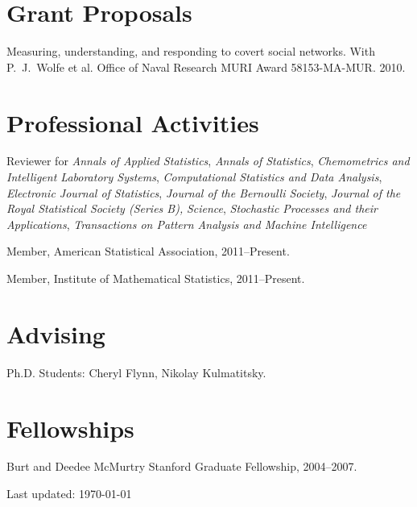 \documentclass[10pt,letterpaper]{article}
\renewenvironment{itemize}{
  \begin{list}{}{
    \setlength{\leftmargin}{1.5em}
    \setlength{\itemsep}{0.25em}
    \setlength{\parskip}{0pt}
    \setlength{\parsep}{0.25em}
  }
}{
  \end{list}
}
\begin{document}
\section*{Grant Proposals}
\begin{itemize}
  \item Measuring, understanding, and responding to covert social networks.
  With P.~J.~Wolfe et al.
  Office of Naval Research MURI Award 58153-MA-MUR.
  2010.
\end{itemize}


\section*{Professional Activities}

\begin{itemize}
\item Reviewer for
  \textit{Annals of Applied Statistics},
  \textit{Annals of Statistics},
  \textit{Chemometrics and Intelligent Laboratory Systems},
  \textit{Computational Statistics and Data Analysis},
  \textit{Electronic Journal of Statistics},
  \textit{Journal of the Bernoulli Society},
  \textit{Journal of the Royal Statistical Society (Series B),}
  \textit{Science},
  \textit{Stochastic Processes and their Applications},
  \textit{Transactions on Pattern Analysis and Machine Intelligence}
\item Member, American Statistical Association, 2011--Present.
\item Member, Institute of Mathematical Statistics, 2011--Present.
\end{itemize}

\section*{Advising}

\begin{itemize}
\item Ph.D. Students: Cheryl Flynn, Nikolay Kulmatitsky.
\end{itemize}

\section*{Fellowships}

\begin{itemize}
\item Burt and Deedee McMurtry Stanford Graduate Fellowship, 2004--2007.
\end{itemize}

\medskip

\begin{center}
  \begin{small}
    Last updated: \today
  \end{small}
\end{center}
\end{document}
